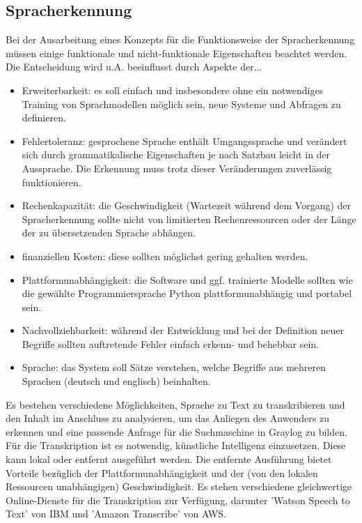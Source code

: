 \subsection{Spracherkennung}

Bei der Ausarbeitung eines Konzepts für die Funktionsweise der Spracherkennung müssen einige funktionale und nicht-funktionale Eigenschaften beachtet werden. Die Entscheidung wird u.A. beeinflusst durch Aspekte der... 

\begin{itemize}
\item Erweiterbarkeit: es soll einfach und insbesondere ohne ein notwendiges Training von Sprachmodellen möglich sein, neue Systeme und Abfragen zu definieren.
\item Fehlertoleranz: gesprochene Sprache enthält Umgangssprache und verändert sich durch grammatikalische Eigenschaften je nach Satzbau leicht in der Aussprache. Die Erkennung muss trotz dieser Veränderungen zuverlässig funktionieren.
\item Rechenkapazität: die Geschwindigkeit (Wartezeit während dem Vorgang) der Spracherkennung sollte nicht von limitierten Rechenressourcen oder der Länge der zu übersetzenden Sprache abhängen.
\item finanziellen Kosten: diese sollten möglichst gering gehalten werden.
\item Plattformunabhängigkeit: die Software und ggf. trainierte Modelle sollten wie die gewählte Programmiersprache Python plattformunabhängig und portabel sein.
\item Nachvollziehbarkeit: während der Entwicklung und bei der Definition neuer Begriffe sollten auftretende Fehler einfach erkenn- und behebbar sein.
\item Sprache: das System soll Sätze verstehen, welche Begriffe aus mehreren Sprachen (deutsch und englisch) beinhalten.
\end{itemize}

Es bestehen verschiedene Möglichkeiten, Sprache zu Text zu transkribieren und den Inhalt im Anschluss zu analysieren, um das Anliegen des Anwenders zu erkennen und eine passende Anfrage für die Suchmaschine in Graylog zu bilden. Für die Transkription ist es notwendig, künstliche Intelligenz einzusetzen. Diese kann lokal oder entfernt ausgeführt werden. Die entfernte Ausführung bietet Vorteile bezüglich der Plattformunabhängigkeit und der (von den lokalen Ressourcen unabhängigen) Geschwindigkeit. Es stehen verschiedene gleichwertige Online-Dienste für die Transkription zur Verfügung, darunter 'Watson Speech to Text' von IBM und 'Amazon Transcribe' von AWS.

